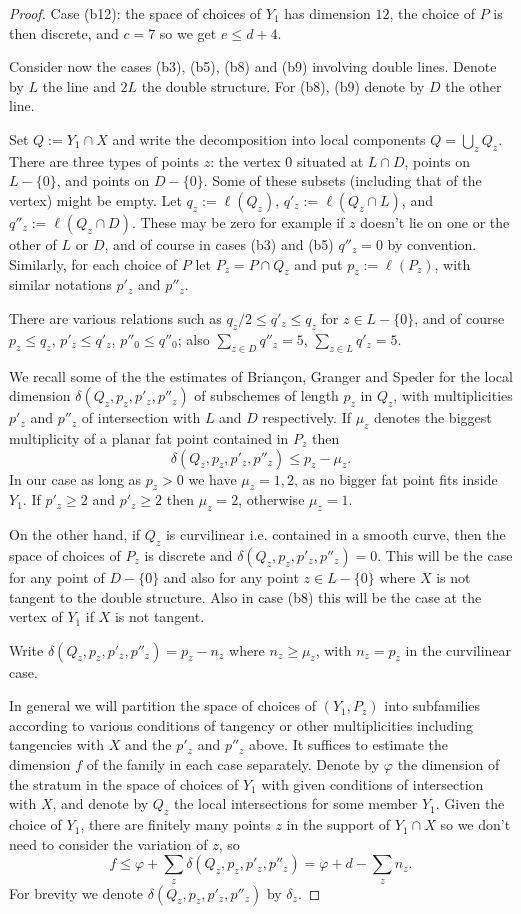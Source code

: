 \documentclass{amsart}
\theoremstyle{plain}
\numberwithin{equation}{section}
\begin{document}
\begin{proof}
Case (b12): the space of choices of $Y_1$ has dimension $12$, the choice of $P$ is 
then discrete, and $c=7$
so we get $e\leq d+4$. 

Consider now the cases (b3), (b5), (b8) and (b9) involving double lines.
Denote by $L$ the line and $2L$ the double structure. For (b8), 
(b9) denote by $D$ the other line.

Set $Q:= Y_1\cap X$ and write the decomposition into local components $Q=\bigcup _zQ_z$.
There are three types of points $z$: the vertex $0$ situated
at $L\cap D$, points on $L- \{0\}$, and points on $D-\{ 0\}$. Some of these subsets
(including that of the vertex) might be empty. 
Let $q_z:= \ell (Q_z)$, $q'_z:= \ell (Q_z\cap L)$, and $q''_z:= \ell (Q_z\cap D)$.
These may be zero for example if $z$ doesn't lie on one or the other of $L$ or $D$,
and of course in cases (b3) and (b5) $q''_z=0$ by convention.
Similarly, for each choice of $P$ let $P_z=P\cap Q_z$ and 
put $p_z:= \ell (P_z)$, with similar notations $p'_z$ and $p''_z$. 

There are various relations such as $q_z/2 \leq q'_z\leq q_z$ for $z\in L-\{ 0\}$,
and of course $p_z\leq q_z$, $p'_z\leq q'_z$, $p''_0\leq q''_0$; also
$\sum _{z\in D}q''_z = 5$, $\sum _{z\in L}q'_z = 5$. 

We recall some of the the estimates of 
Brian\c{c}on, Granger and Speder for the local dimension
$\delta (Q_z,p_z,p'_z,p''_z)$ of subschemes of length $p_z$ in $Q_z$, with
multiplicities $p'_z$ and $p''_z$ of intersection with $L$ and $D$ respectively. 
If $\mu _z$ denotes
the biggest multiplicity of a planar fat point contained in $P_z$ then 
$$
\delta (Q_z,p_z,p'_z,p''_z)\leq p_z -\mu _z.
$$
In our case as long as $p_z>0$ we have $\mu _z=1,2$, as no bigger fat point fits inside $Y_1$.
If $p'_z\geq 2$ and $p'_z\geq 2$ then $\mu _z=2$, otherwise $\mu _z=1$.

On the other hand, if $Q_z$ is curvilinear i.e. contained in a smooth curve, then 
the space of choices of $P_z$ is discrete and $\delta (Q_z,p_z,p'_z,p''_z)=0$.
This will be the case for any point of $D - \{ 0\}$ and also for any point $z\in L-\{0\}$
where $X$ is not tangent to the double structure. Also in case (b8)
this will be the case at the vertex of $Y_1$ if $X$ is not tangent. 

Write $\delta (Q_z,p_z,p'_z,p''_z)= p_z - n_z$ where $n_z \geq \mu _z$,
with $n_z = p_z$ in the curvilinear case. 

In general we will partition the space of choices of $(Y_1,P_z)$ into subfamilies according
to various conditions of tangency or other multiplicities including 
tangencies with $X$ and the $p'_z$ and $p''_z$
above. It suffices to estimate the dimension $f$ of the family in each case separately.
Denote by $\varphi$ the dimension of the stratum in the space of choices of $Y_1$
with given conditions of intersection with $X$, and denote by $Q_z$ the local 
intersections for some member $Y_1$. Given the choice of $Y_1$, there are finitely
many points $z$ in the support of $Y_1\cap X$ so we don't need to consider the
variation of $z$, so 
$$
f\leq  \varphi + \sum _z \delta (Q_z,p_z,p'_z,p''_z) = \varphi + d - \sum _zn_z.
$$
For brevity we denote $\delta (Q_z,p_z,p'_z,p''_z)$ by $\delta _z$. 


\end{proof}
\end{document}
